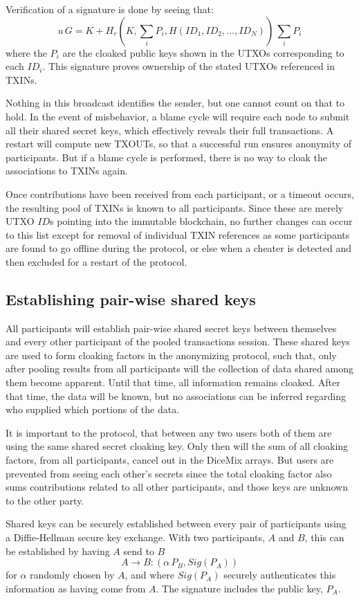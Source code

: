 \documentclass[8pt,fleqn,openany]{book}
\begin{document}
{		Verification of a signature is done by seeing that:
		$$u \, G = K + H_r(K, \sum_i{P_i}, H(ID_1, ID_2, ..., ID_N)) \, \sum_i{P_i}$$
		where the $P_i$ are the cloaked public keys shown in the UTXOs corresponding to each $ID_i$. This signature proves ownership of the stated UTXOs referenced in TXINs.
		
		Nothing in this broadcast identifies the sender, but one cannot count on that to hold. In the event of misbehavior, a blame cycle will require each node to submit all their shared secret keys, which effectively reveals their full transactions. A restart will compute new TXOUTs, so that a successful run ensures anonymity of participants. But if a blame cycle is performed, there is no way to cloak the associations to TXINs again.
		
		Once contributions have been received from each participant, or a timeout occurs, the resulting pool of TXINs is known to all participants. Since these are merely UTXO $ID$s pointing into the immutable blockchain, no further changes can occur to this list except for removal of individual TXIN references as some participants are found to go offline during the protocol, or else when a cheater is detected and then excluded for a restart of the protocol.
		
		\subsection{Establishing pair-wise shared keys} 
		All participants will establish pair-wise shared secret keys between themselves and every other participant of the pooled transactions session. These shared keys are used to form cloaking factors in the anonymizing protocol, such that, only after pooling results from all participants will the collection of data shared among them become apparent. Until that time, all information remains cloaked. After that time, the data will be known, but no associations can be inferred regarding who supplied which portions of the data. 
		
		It is important to the protocol, that between any two users both of them are using the same shared secret cloaking key. Only then will the sum of all cloaking factors, from all participants, cancel out in the DiceMix arrays. But users are prevented from seeing each other’s secrets since the total cloaking factor also sums contributions related to all other participants, and those keys are unknown to the other party.
		
		Shared keys can be securely established between every pair of participants using a Diffie-Hellman secure key exchange\cite{c21}. With two participants, $A$ and $B$, this can be established by having $A$ send to $B$
		$$A \rightarrow B: (\alpha \, P_B, Sig(P_A))$$
		for $\alpha$ randomly chosen by $A$, and where $Sig(P_A)$ securely authenticates this information as having come from $A$. The signature includes the public key, $P_A$. 
		
}
\end{document}
